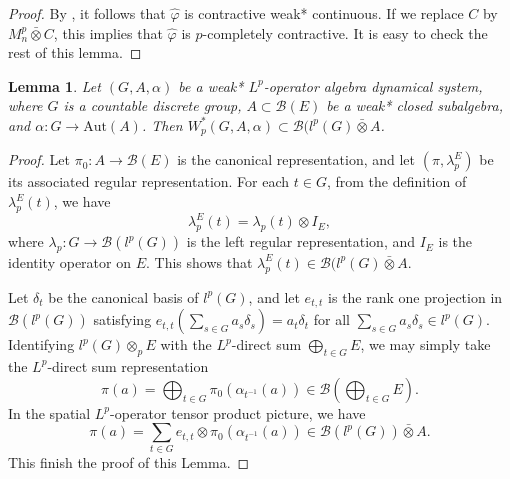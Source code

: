 \documentclass[reqno,11pt]{amsart}
\theoremstyle{plain}
\newtheorem{lem}[thm]{Lemma}
\theoremstyle{definition}
\theoremstyle{remark}
\newcommand{\B}{\mathcal{B}}
\begin{document}
\begin{proof}
By \cite[Theorem 6.4]{Daws1}, it follows that $\hat{\varphi}$ is contractive weak* continuous. If we replace $C$ by $M_n^p\bar{\otimes} C$, this implies that $\hat{\varphi}$ is $p$-completely contractive. It is easy to check the rest of this lemma.
\end{proof}


\begin{lem}\label{tensor3}
Let $(G,A,\alpha)$ be a weak* $L^p$-operator algebra dynamical system, where $G$ is a countable discrete group, $A\subset \mathcal{B}(E)$ be a weak* closed subalgebra, and $\alpha:G\rightarrow \mathrm{Aut}(A)$. Then $W^*_p(G,A,\alpha)\subset \mathcal{B}(l^p(G)\bar{\otimes}A$.
\end{lem}
\begin{proof}
Let $\pi_0:A\rightarrow \mathcal{B}(E)$ is the canonical representation, and let $(\pi,\lambda_p^E)$ be its associated regular representation.
For each $t\in G$, from the definition of $\lambda_p^E(t)$, we have $$\lambda_p^E(t)=\lambda_p(t)\otimes I_E,$$ where $\lambda_p:G\rightarrow \mathcal{B}(l^p(G))$ is the left regular representation, and $I_E$ is the identity operator on $E$. This shows that $\lambda_p^E(t)\in \mathcal{B}(l^p(G)\bar{\otimes}A$.

Let $\delta_t$ be the canonical basis of $l^p(G)$, and let $e_{t,t}$ is the rank one projection in $\B(l^p(G))$ satisfying $e_{t,t}(\sum_{s\in G} a_s\delta_s)=a_t\delta_t$ for all $\sum_{s\in G} a_s\delta_s\in l^p(G)$.
Identifying $l^p(G)\otimes_p E$ with the $L^p$-direct sum $\bigoplus_{t\in G}E$, we may simply take the $L^p$-direct sum representation $$\pi (a)=\bigoplus_{t\in G}\pi_0(\alpha_{t^{-1}}(a))\in \mathcal{B}(\bigoplus_{t\in G}E).$$
In the spatial $L^p$-operator tensor product picture, we have $$\pi(a)=\sum_{t\in G}e_{t,t}\otimes \pi_0(\alpha_{t^{-1}}(a))\in \mathcal{B}(l^p(G))\bar{\otimes}A.$$ This finish the proof of this Lemma.
\end{proof}
\end{document}
